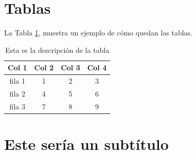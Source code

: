 \section{Tablas}
La Tabla \ref{refdelatabla}, muestra un ejemplo de cómo quedan las tablas.

\begin{table}[!ht]
    \vspace{\baselineskip}
    \caption{Esta es la descripción de la tabla}
    \label{refdelatabla}
    \centering
    \begin{tabular}{cccc}
        \hline
        \hline
        Col 1   & Col 2 & Col 3 &  Col 4\\
        \hline
        fila 1  & 1     & 2     & 3\\
        fila 2  & 4     & 5     & 6\\
        fila 3  & 7     & 8     & 9\\
        \hline
        \hline
    \end{tabular}
\end{table}



\section{Este sería un subtítulo}
%
\lipsum[3-4]
